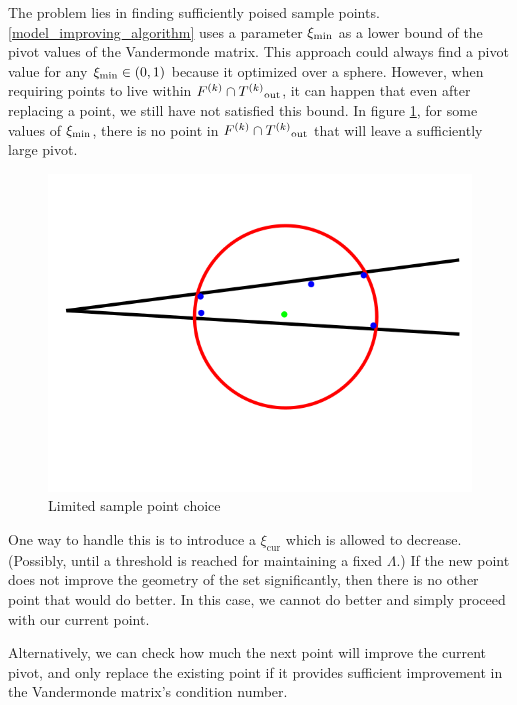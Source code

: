 The problem lies in finding sufficiently poised sample points.
\cref{model_improving_algorithm} uses a parameter $  \xi_{\text{min}} $ as a lower bound of the pivot values of the Vandermonde matrix.
This approach could always find a pivot value for any $ \xi_{\text{min}} \in (0,1)$ because it optimized over a sphere.
However, when requiring points to live within $ {F}^{(k)} \cap {T^{(k)}}_{\text{out}} $, it can happen that even after replacing a point, we still have not satisfied this bound.
In figure \cref{lspc}, for some values of $  \xi_{\text{min}} $, there is no point in $ {F}^{(k)} \cap {T^{(k)}}_{\text{out}} $ that will leave a sufficiently large pivot.

\begin{figure}[h]
    \centering
    \includegraphics[scale=0.4]{images/bad_lambda.png}
    \caption{Limited sample point choice}
    \label{lspc}
\end{figure}


One way to handle this is to introduce a $\xi_{\text{cur}}$ which is allowed to decrease.
(Possibly, until a threshold is reached for maintaining a fixed $\Lambda$.)
If the new point does not improve the geometry of the set significantly, then there is no other point that would do better.
In this case, we cannot do better and simply proceed with our current point.

Alternatively, we can check how much the next point will improve the current pivot, and only replace the existing point if it provides sufficient improvement in the Vandermonde matrix's condition number.



